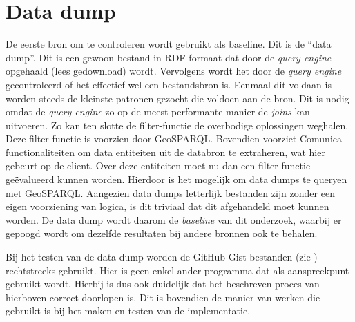 \section{Data dump}
\label{sec:data-dump}
De eerste bron om te controleren wordt gebruikt als baseline. Dit is de ``data dump''. Dit is een gewoon bestand in RDF formaat dat door de \textit{query engine} opgehaald (lees gedownload) wordt. Vervolgens wordt het door de \textit{query engine} gecontroleerd of het effectief wel een bestandsbron is. Eenmaal dit voldaan is worden steeds de kleinste patronen gezocht die voldoen aan de bron. Dit is nodig omdat de \textit{query engine} zo op de meest performante manier de \textit{joins} kan uitvoeren. Zo kan ten slotte de filter-functie de overbodige oplossingen weghalen. Deze filter-functie is voorzien door GeoSPARQL. Bovendien voorziet Comunica functionaliteiten om data entiteiten uit de databron te extraheren, wat hier gebeurt op de client. Over deze entiteiten moet nu dan een filter functie geëvalueerd kunnen worden. Hierdoor is het mogelijk om data dumps te queryen met GeoSPARQL. Aangezien data dumps letterlijk bestanden zijn zonder een eigen voorziening van logica, is dit triviaal dat dit afgehandeld moet kunnen worden. De data dump wordt daarom de \textit{baseline} van dit onderzoek, waarbij er gepoogd wordt om dezelfde resultaten bij andere bronnen ook te behalen.

Bij het testen van de data dump worden de GitHub Gist bestanden (zie ) rechtstreeks gebruikt. Hier is geen enkel ander programma dat als aanspreekpunt gebruikt wordt. Hierbij is dus ook duidelijk dat het beschreven proces van hierboven correct doorlopen is. Dit is bovendien de manier van werken die gebruikt is bij het maken en testen van de implementatie.